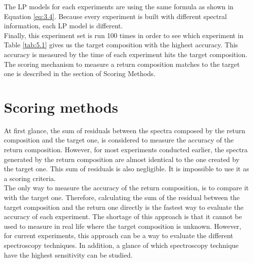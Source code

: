 The LP models for each experiments are using the same formula as shown in Equation \ref{eq:3.4}. Because every experiment is built with different spectral information, each LP model is different. \\

Finally, this experiment set is run 100 times in order to see which experiment in Table \ref{tab:5.1} gives us the target composition with the highest accuracy. This accuracy is measured by the time of each experiment hits the target composition. The scoring mechanism to measure a return composition matches to the target one is described in the section of Scoring Methods. \\

\section{Scoring methods}

At first glance, the sum of residuals between the spectra composed by the return composition and the target one, is considered to measure the accuracy of the return composition. However, for most experiments conducted earlier, the spectra generated by the return composition are almost identical to the one created by the target one.   This sum of residuals is also negligible. It is impossible to use it as a scoring criteria. \\

The only way to measure the accuracy of the return composition, is to compare it with the target one. Therefore, calculating the sum of the residual between the target composition and the return one directly is the fastest way to evaluate the accuracy of each experiment. The shortage of this approach is that it cannot be used to measure in real life where the target composition is unknown. However, for current experiments, this approach can be a way to evaluate the different spectroscopy techniques. In addition, a glance of which spectroscopy technique have the highest sensitivity can be studied. \\



